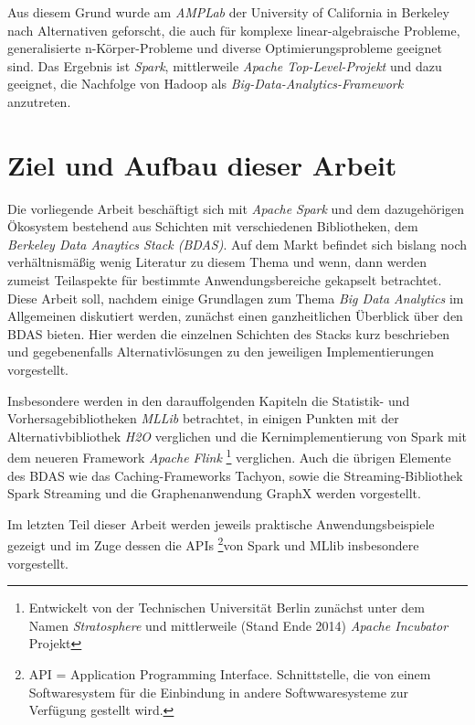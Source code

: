 Aus diesem Grund wurde am \textit{AMPLab} der University of California in Berkeley nach Alternativen geforscht, die auch für komplexe linear-algebraische Probleme, generalisierte n-Körper-Probleme und diverse Optimierungsprobleme geeignet sind. Das Ergebnis ist \textit{Spark}, mittlerweile \textit{Apache Top-Level-Projekt} und dazu geeignet, die Nachfolge von Hadoop als \textit{Big-Data-Analytics-Framework} anzutreten. 

\section{Ziel und Aufbau dieser Arbeit}
\label{section:ziel dieser Arbeit}

Die vorliegende Arbeit beschäftigt sich mit \textit{Apache Spark} und dem dazugehörigen Ökosystem bestehend aus Schichten mit verschiedenen Bibliotheken, dem \textit{Berkeley Data Anaytics Stack (BDAS)}. Auf dem Markt befindet sich bislang noch verhältnismäßig wenig Literatur zu diesem Thema und wenn, dann werden zumeist Teilaspekte für bestimmte Anwendungsbereiche gekapselt betrachtet. Diese Arbeit soll, nachdem einige Grundlagen zum Thema \textit{Big Data Analytics} im Allgemeinen diskutiert werden, zunächst einen ganzheitlichen Überblick über den BDAS bieten. Hier werden die einzelnen Schichten des Stacks kurz beschrieben und gegebenenfalls Alternativlösungen zu den jeweiligen Implementierungen vorgestellt. 

Insbesondere werden in den darauffolgenden Kapiteln die Statistik- und Vorhersagebibliotheken \textit{MLLib} betrachtet, in einigen Punkten mit der Alternativbibliothek \textit{H2O} verglichen und die Kernimplementierung von Spark mit dem neueren Framework \textit{Apache Flink} \footnote{Entwickelt von der Technischen Universität Berlin zunächst unter dem Namen \textit{Stratosphere} und mittlerweile (Stand Ende 2014) \textit{Apache Incubator} Projekt} verglichen. Auch die übrigen Elemente des BDAS wie das Caching-Frameworks Tachyon, sowie die Streaming-Bibliothek Spark Streaming und die Graphenanwendung GraphX werden vorgestellt. 

Im letzten Teil dieser Arbeit werden jeweils praktische Anwendungsbeispiele gezeigt und im Zuge dessen die APIs \footnote{API = Application Programming Interface. Schnittstelle, die von einem Softwaresystem für die Einbindung in andere Softwwaresysteme zur Verfügung gestellt wird.}von Spark und MLlib insbesondere vorgestellt.   


